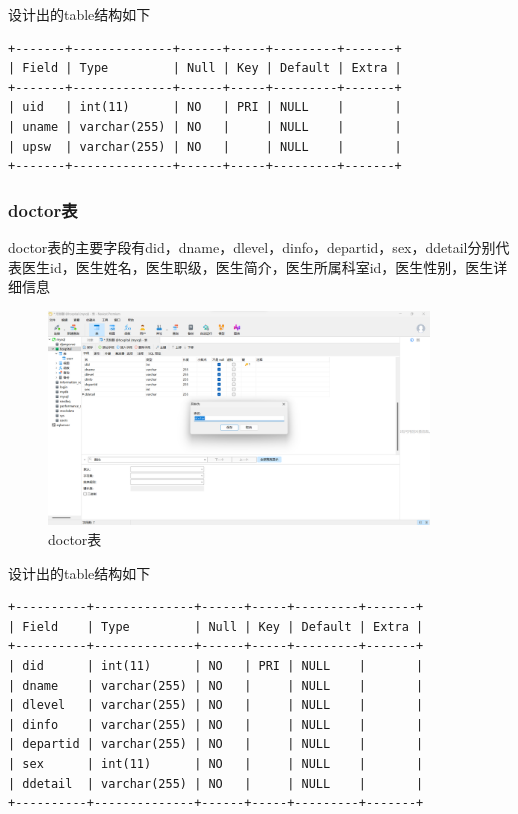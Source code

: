 \documentclass[UTF8,12pt]{article}
\begin{document}
设计出的table结构如下

\begin{lstlisting}[frame=shadowbox]
+-------+--------------+------+-----+---------+-------+
| Field | Type         | Null | Key | Default | Extra |
+-------+--------------+------+-----+---------+-------+
| uid   | int(11)      | NO   | PRI | NULL    |       |
| uname | varchar(255) | NO   |     | NULL    |       |
| upsw  | varchar(255) | NO   |     | NULL    |       |
+-------+--------------+------+-----+---------+-------+
\end{lstlisting}

\subsubsection{doctor表}

doctor表的主要字段有did，dname，dlevel，dinfo，departid，sex，ddetail分别代表医生id，医生姓名，医生职级，医生简介，医生所属科室id，医生性别，医生详细信息

\begin{figure}[htbp]
    \centering
    \includegraphics[width=0.9\textwidth]{imgs/6.png}
    \caption{doctor表}
\end{figure}

设计出的table结构如下

\begin{lstlisting}[frame=shadowbox]
+----------+--------------+------+-----+---------+-------+
| Field    | Type         | Null | Key | Default | Extra |
+----------+--------------+------+-----+---------+-------+
| did      | int(11)      | NO   | PRI | NULL    |       |
| dname    | varchar(255) | NO   |     | NULL    |       |
| dlevel   | varchar(255) | NO   |     | NULL    |       |
| dinfo    | varchar(255) | NO   |     | NULL    |       |
| departid | varchar(255) | NO   |     | NULL    |       |
| sex      | int(11)      | NO   |     | NULL    |       |
| ddetail  | varchar(255) | NO   |     | NULL    |       |
+----------+--------------+------+-----+---------+-------+
\end{lstlisting}
\end{document}
